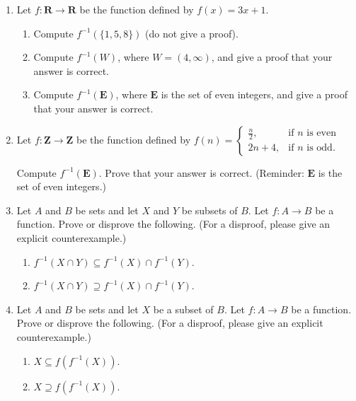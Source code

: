 \documentclass[12pt]{article}
\begin{document}
\begin{enumerate}
\item Let $f \colon \mathbf{R} \to \mathbf{R}$ be the function defined by $f(x) = 3x+1$. 
 \begin{enumerate}
 \item Compute $f^{-1}(\{1,5,8\})$ (do not give a proof).
 \item Compute $f^{-1}(W)$, where $W = (4,\infty)$, and give a proof that your answer is correct.
 \item Compute $f^{-1}(\mathbf{E})$, where $\mathbf{E}$ is the set of even integers, and give a proof that your answer is correct.
 \end{enumerate}

\item Let $f \colon \mathbf{Z} \to \mathbf{Z}$ be the function defined by $f(n) =
 \begin{cases}
 \frac{n}{2}, & \text{if $n$ is even} \\
 2n+4, & \text{if $n$ is odd}.
 \end{cases}
 $
 
 Compute $f^{-1}(\mathbf{E})$. Prove that your answer is correct. (Reminder: $\mathbf{E}$ is the set of even integers.)

\item Let $A$ and $B$ be sets and let $X$ and $Y$ be subsets of $B$. Let $f\colon A \to B$ be a function. Prove or disprove the following. (For a disproof, please give an explicit counterexample.) 
  \begin{enumerate}
  \item $f^{-1}(X \cap Y) \subseteq f^{-1}(X) \cap f^{-1}(Y)$.
  \item $f^{-1}(X \cap Y) \supseteq f^{-1}(X) \cap f^{-1}(Y)$.
  \end{enumerate}


\item Let $A$ and $B$ be sets and let $X$ be a subset of $B$. Let $f\colon A \to B$ be a function. Prove or disprove the following. (For a disproof, please give an explicit counterexample.)
 \begin{enumerate}
 \item $X \subseteq f(f^{-1}(X))$.
 \item $X \supseteq f(f^{-1}(X))$.
 \end{enumerate}

 

\end{enumerate}
\end{document}
